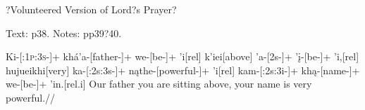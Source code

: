 \documentclass[12pt]{article}
\begin{document}

\begin{center}
\large ?Volunteered Version of Lord?s Prayer?
\end{center}
Text: p38. Notes: pp39?40.

\bigskip

\bigskip
\ex
\begingl
Ki-[\textsc{:1p:3s}-]+
kh\'a'a-[father-]+
we-[be-]+
'i[{\sc rel}]
k'iei[above]
'a-[\sc2s-]+
'\k i-[be-]+
'i,[{\sc rel}]
hujueikhi[very]
ka-[\sc:2s:3s-]+
n\k athe-[powerful-]+
'i[\sc rel]
kam-[\sc:2s:3i-]+
kh\k a-[name-]+
we-[be-]+
'in.[\sc rel.i]
\endilg
\glft Our father you are sitting above, your name is very powerful.//
\endgl
\xe
\end{document}
